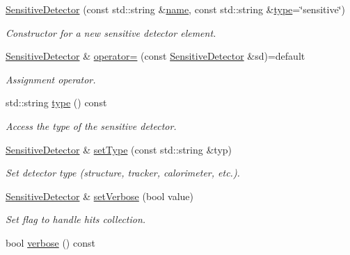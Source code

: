 \begin{DoxyCompactItemize}
\hyperlink{class_d_d4hep_1_1_geometry_1_1_sensitive_detector_a5bc99cbb0d0101285a63e7c95b91561b}{Sensitive\+Detector} (const std\+::string \&\hyperlink{class_d_d4hep_1_1_handle_a27c7d467a609ab32c133e1f3c7d85ef5}{name}, const std\+::string \&\hyperlink{class_d_d4hep_1_1_geometry_1_1_sensitive_detector_ab4ae71a64aeb6736d325a38469f7bcb8}{type}=\char`\"{}sensitive\char`\"{})
\begin{DoxyCompactList}\small\item\em Constructor for a new sensitive detector element. \end{DoxyCompactList}\item 
\hyperlink{class_d_d4hep_1_1_geometry_1_1_sensitive_detector}{Sensitive\+Detector} \& \hyperlink{class_d_d4hep_1_1_geometry_1_1_sensitive_detector_a7b1002e891694f89407289957f875b21}{operator=} (const \hyperlink{class_d_d4hep_1_1_geometry_1_1_sensitive_detector}{Sensitive\+Detector} \&sd)=default
\begin{DoxyCompactList}\small\item\em Assignment operator. \end{DoxyCompactList}\item 
std\+::string \hyperlink{class_d_d4hep_1_1_geometry_1_1_sensitive_detector_ab4ae71a64aeb6736d325a38469f7bcb8}{type} () const
\begin{DoxyCompactList}\small\item\em Access the type of the sensitive detector. \end{DoxyCompactList}\item 
\hyperlink{class_d_d4hep_1_1_geometry_1_1_sensitive_detector}{Sensitive\+Detector} \& \hyperlink{class_d_d4hep_1_1_geometry_1_1_sensitive_detector_afe67bf4bb87340757c66a68fb410bf94}{set\+Type} (const std\+::string \&typ)
\begin{DoxyCompactList}\small\item\em Set detector type (structure, tracker, calorimeter, etc.). \end{DoxyCompactList}\item 
\hyperlink{class_d_d4hep_1_1_geometry_1_1_sensitive_detector}{Sensitive\+Detector} \& \hyperlink{class_d_d4hep_1_1_geometry_1_1_sensitive_detector_ae6c42b0c547eb06bddfd84c27a5b9e87}{set\+Verbose} (bool value)
\begin{DoxyCompactList}\small\item\em Set flag to handle hits collection. \end{DoxyCompactList}\item 
bool \hyperlink{class_d_d4hep_1_1_geometry_1_1_sensitive_detector_a133502f6af4d36644001fd188d283d4b}{verbose} () const

\end{DoxyCompactItemize}
